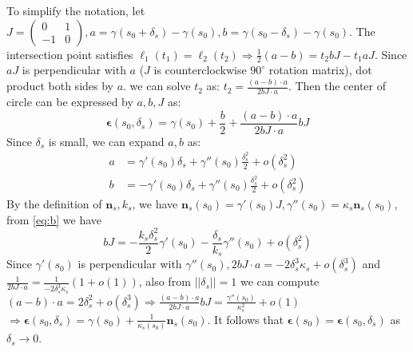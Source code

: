 \documentclass{article}
\begin{document}
\begin{enumerate}
\begin{solution}
To simplify the notation, let $J=\begin{pmatrix}0 & 1 \\ -1 & 0\end{pmatrix},a=\gamma(s_0+\delta_s)-\gamma(s_0),b=\gamma(s_0-\delta_s)-\gamma(s_0)$.
The intersection point satisfies $\ell_1(t_1)=\ell_2(t_2) \Rightarrow \frac{1}{2}(a-b)=t_2bJ-t_1aJ$.
Since $aJ$ is perpendicular with $a$ ($J$ is counterclockwise $90^\circ$ rotation matrix), dot product both sides by $a$. we can solve $t_2$ as:
$t_2=\frac{(a-b)\cdot a}{2bJ\cdot a}$.
Then the center of circle can be expressed by $a,b,J$ as:
$$
\bm{\epsilon}(s_0,\delta_s)=\gamma(s_0)+\frac{b}{2}+\frac{(a-b)\cdot a}{2bJ\cdot a} bJ
$$
Since $\delta_s$ is small, we can expand $a,b$ as:
\begin{subequations}
\begin{align}
\label{eq:a}a & = \gamma'(s_0) \delta_s + \gamma''(s_0)\frac{\delta_s^2}{2} +o(\delta_s^2)\\
\label{eq:b}b & = -\gamma'(s_0) \delta_s + \gamma''(s_0)\frac{\delta_s^2}{2} +o(\delta_s^2)
\end{align}
\end{subequations}
By the definition of $\bm{n}_s,k_s$, we have $\bm{n}_s(s_0) =\gamma'(s_0)J,\gamma''(s_0)=\kappa_s \bm{n}_s(s_0)$, from \eqref{eq:b} we have
\begin{equation}
bJ = -\frac{k_s \delta_s^2}{2} \gamma'(s_0) -\frac{\delta_s}{k_s}\gamma''(s_0)+ o(\delta_s^2) 
\end{equation}
Since $\gamma'(s_0)$ is perpendicular with $\gamma''(s_0),2bJ\cdot a=-2\delta_s^3 \kappa_s + o(\delta_s^3)$ and $\frac{1}{2bJ\cdot a} =\frac{1}{-2\delta_s^3 \kappa_s}(1+o(1))$, also from $||\delta_s||=1$ we can compute $(a-b)\cdot a = 2\delta_s^2 + o(\delta_s^3)\Rightarrow \frac{(a-b)\cdot a }{2bJ\cdot a}bJ = \frac{\gamma''(s_0)}{\kappa^2_s}+o(1)$$\Rightarrow \bm{\epsilon}(s_0,\delta_s)=\gamma(s_0)+\frac{1}{\kappa_s(s_0)}\bm{n}_s(s_0)$. It follows that $\bm{\epsilon}(s_0)=\bm{\epsilon}(s_0,\delta_s)$ as $\delta_s\to 0$.
\end{solution}
\end{enumerate}
\end{document}
